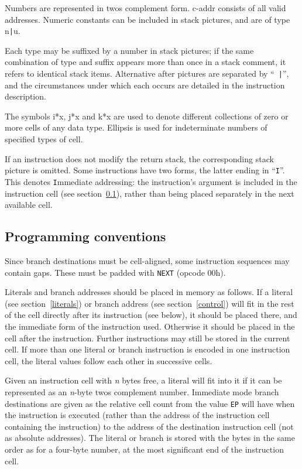 \documentclass{article}
\newcommand{\spic}[1]{{\spfont\setlength{\baselineskip}{\normalbaselineskip}#1\/}}
\begin{document}
Numbers are represented in twos complement form. \spic{c-addr} consists of all
valid addresses. Numeric constants can be included in
stack pictures, and are of type \spic{n{\tt |}u}.

Each type may be suffixed by a number in stack pictures; if the same combination
of type and suffix appears more than once in a stack comment, it refers to
identical stack items. Alternative \spic{after} pictures are separated by ``{\tt
|}'', and the circumstances under which each occurs are detailed in the
instruction description.

The symbols \spic{i*x}, \spic{j*x} and \spic{k*x} are used to denote different
collections of zero or more cells of any data type. Ellipsis is used for
indeterminate numbers of specified types of cell.

If an instruction does not modify the return stack, the corresponding stack
picture is omitted. Some instructions have two forms, the latter ending in
``{\tt I}''. This denotes {\tt I}mmediate addressing: the instruction's argument
is included in the instruction cell (see section~\ref{conventions}), rather than
being placed separately in the next available cell.


\subsection{Programming conventions}
\label{conventions}

Since branch destinations must be cell-aligned, some instruction sequences may
contain gaps. These must be padded with {\tt NEXT} (opcode 00h).

Literals and branch addresses should be placed in memory as follows. If a
literal (see section~\ref{literals}) or branch address (see section~\ref{control})
will fit in the rest of the cell directly after its instruction
(see below), it should be placed there, and the immediate form of the
instruction used. Otherwise it should be placed in the cell after the
instruction. Further instructions may still be stored in the current cell. If
more than one literal or branch instruction is encoded in one instruction cell,
the literal values follow each other in successive cells.

Given an instruction cell with \textit{n} bytes free, a literal will fit into
it if it can be represented as an \textit{n}-byte twos complement number.
Immediate mode branch destinations are given as the relative cell count from
the value {\tt EP} will have when the instruction is executed (rather than the
address of the instruction cell containing the instruction) to the address of
the destination instruction cell (not as absolute addresses). The literal or
branch is stored with the bytes in the same order as for a four-byte number, at
the most significant end of the instruction cell.
\end{document}
